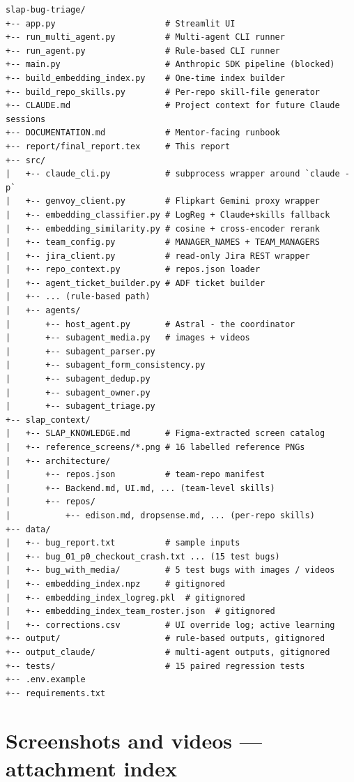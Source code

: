 \documentclass[11pt,a4paper]{article}
\begin{document}
\begin{lstlisting}
slap-bug-triage/
+-- app.py                      # Streamlit UI
+-- run_multi_agent.py          # Multi-agent CLI runner
+-- run_agent.py                # Rule-based CLI runner
+-- main.py                     # Anthropic SDK pipeline (blocked)
+-- build_embedding_index.py    # One-time index builder
+-- build_repo_skills.py        # Per-repo skill-file generator
+-- CLAUDE.md                   # Project context for future Claude sessions
+-- DOCUMENTATION.md            # Mentor-facing runbook
+-- report/final_report.tex     # This report
+-- src/
|   +-- claude_cli.py           # subprocess wrapper around `claude -p`
|   +-- genvoy_client.py        # Flipkart Gemini proxy wrapper
|   +-- embedding_classifier.py # LogReg + Claude+skills fallback
|   +-- embedding_similarity.py # cosine + cross-encoder rerank
|   +-- team_config.py          # MANAGER_NAMES + TEAM_MANAGERS
|   +-- jira_client.py          # read-only Jira REST wrapper
|   +-- repo_context.py         # repos.json loader
|   +-- agent_ticket_builder.py # ADF ticket builder
|   +-- ... (rule-based path)
|   +-- agents/
|       +-- host_agent.py       # Astral - the coordinator
|       +-- subagent_media.py   # images + videos
|       +-- subagent_parser.py
|       +-- subagent_form_consistency.py
|       +-- subagent_dedup.py
|       +-- subagent_owner.py
|       +-- subagent_triage.py
+-- slap_context/
|   +-- SLAP_KNOWLEDGE.md       # Figma-extracted screen catalog
|   +-- reference_screens/*.png # 16 labelled reference PNGs
|   +-- architecture/
|       +-- repos.json          # team-repo manifest
|       +-- Backend.md, UI.md, ... (team-level skills)
|       +-- repos/
|           +-- edison.md, dropsense.md, ... (per-repo skills)
+-- data/
|   +-- bug_report.txt          # sample inputs
|   +-- bug_01_p0_checkout_crash.txt ... (15 test bugs)
|   +-- bug_with_media/         # 5 test bugs with images / videos
|   +-- embedding_index.npz     # gitignored
|   +-- embedding_index_logreg.pkl  # gitignored
|   +-- embedding_index_team_roster.json  # gitignored
|   +-- corrections.csv         # UI override log; active learning
+-- output/                     # rule-based outputs, gitignored
+-- output_claude/              # multi-agent outputs, gitignored
+-- tests/                      # 15 paired regression tests
+-- .env.example
+-- requirements.txt
\end{lstlisting}

\section{Screenshots and videos --- attachment index}
\end{document}
